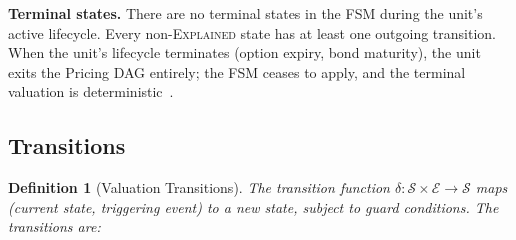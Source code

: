 \documentclass[11pt,a4paper]{article}
\newtheorem{definition}{Definition}[section]
\begin{document}
\noindent \textbf{Terminal states.}  There are no terminal states in the FSM during the unit's active lifecycle.  Every non-\textsc{Explained} state has at least one outgoing transition.  When the unit's lifecycle terminates (option expiry, bond maturity), the unit exits the Pricing DAG entirely; the FSM ceases to apply, and the terminal valuation is deterministic~\cite[\S7]{ledger}.

\subsection{Transitions}

\begin{definition}[Valuation Transitions]
\label{def:val-transitions}
The transition function $\delta : \mathcal{S} \times \mathcal{E} \to \mathcal{S}$ maps (current state, triggering event) to a new state, subject to guard conditions.  The transitions are:
\end{definition}
\end{document}
